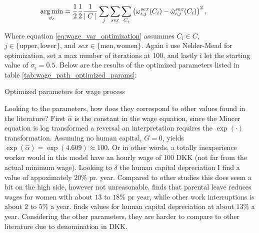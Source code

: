 \begin{equation}\label{eq:wage_var_optimization}
    \underset{\hat{\sigma_\epsilon}}{\operatorname*{arg\,min}} = \frac{1}{2}\frac{1}{2}\frac{1}{\mid C \mid } \sum_{j} \sum_{sex}\sum_{C_i} \left( \omega_{i, j}^{sex}(C_i)  - \tilde{\omega}_{i,j}^{sex}(C_i)\right)^2, \qquad 
\end{equation}

Where equation \eqref{eq:wage_var_optimization} assummes $C_i \in C$, $j \in \{\text{upper},  \text{lower} \}$, and $sex \in \{\text{men}, \text{women} \}$. Again i use Nelder-Mead for optimization, set a max number of iterations at 100, and lastly i let the starting value of $\sigma_\epsilon = 0.5$. Below are the results of the optimized parameters listed in table \ref{tab:wage_path_optimized_params}:

\begin{table}[ht]
    \centering
    
    \caption{Optimized parameters for wage process}
    \label{tab:wage_path_optimized_params}
\end{table}

Looking to the parameters, how does they correspond to other values found in the literature? First $\hat{\alpha} $ is the constant in the wage equation, 
since the Mincer equation is log transformed a reversal an interpretation requires the $\exp (\cdot)$ transformation. 
Assuming no human capital, $G=0$, yields $\exp (\hat{\alpha}) = \exp ( 4.609 ) \approx 100$. 
Or in other words, a totally inexperience worker would in this model have an hourly wage of 100 DKK (not far from the actual minimum wage). 
Looking to $\delta$ the human capital depreciation I find a value of appoximately $20 \%$ pr. year. Compared to other studies this does seem a bit on the high side, however not unreasonable. \textcite{kunze_timing_2002} finds that parental leave reduces wages for women with about $13$ to $18 \%$ pr year, while other work interruptions is about $2$  to $5 \%$ a year. \textcite{light_early-career_1995} finds values for human capital depreciation at about $13 \%$ a year. Considering the other parameters, they are harder to compare to other literature due to denomination in DKK. 


